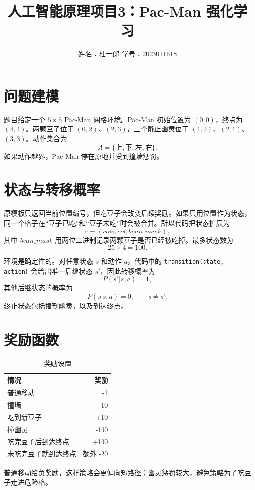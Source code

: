 \documentclass[a4paper,11pt]{article}
\title{人工智能原理项目3：Pac-Man 强化学习}
\author{姓名：杜一郎 \quad 学号：2023011618}
\date{}
\begin{document}
\maketitle

\section{问题建模}

题目给定一个 \(5\times5\) Pac-Man 网格环境。Pac-Man 初始位置为 \((0,0)\)，终点为 \((4,4)\)。两颗豆子位于 \((0,2)\)、\((2,3)\)，三个静止幽灵位于 \((1,2)\)、\((2,1)\)、\((3,3)\)。动作集合为
\[
A=\{\text{上},\text{下},\text{左},\text{右}\}.
\]
如果动作越界，Pac-Man 停在原地并受到撞墙惩罚。

\section{状态与转移概率}

原模板只返回当前位置编号，但吃豆子会改变后续奖励。如果只用位置作为状态，同一个格子在“豆子已吃”和“豆子未吃”时会被合并。所以代码把状态扩展为
\[
s=(row,col,bean\_mask),
\]
其中 \(bean\_mask\) 用两位二进制记录两颗豆子是否已经被吃掉。最多状态数为
\[
25\times4=100.
\]

环境是确定性的。对任意状态 \(s\) 和动作 \(a\)，代码中的 \texttt{transition(state, action)} 会给出唯一后继状态 \(s'\)。因此转移概率为
\[
P(s'|s,a)=1,
\]
其他后继状态的概率为
\[
P(\tilde{s}|s,a)=0,\qquad \tilde{s}\ne s'.
\]
终止状态包括撞到幽灵，以及到达终点。

\section{奖励函数}

\begin{table}[H]
\centering
\caption{奖励设置}
\begin{tabular}{lr}
\toprule
情况 & 奖励\\
\midrule
普通移动 & -1\\
撞墙 & -10\\
吃到新豆子 & +10\\
撞幽灵 & -100\\
吃完豆子后到达终点 & +100\\
未吃完豆子就到达终点 & 额外 -20\\
\bottomrule
\end{tabular}
\end{table}

普通移动给负奖励，这样策略会更偏向短路径；幽灵惩罚较大，避免策略为了吃豆子走进危险格。
\end{document}
